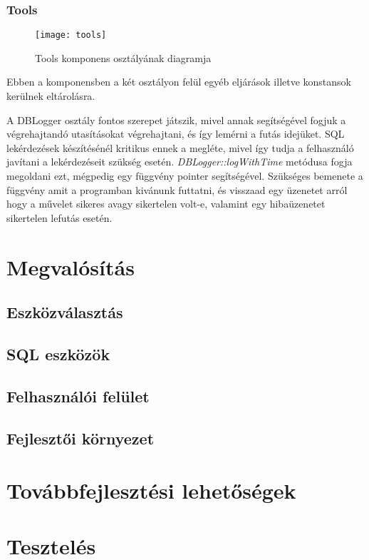 \subsubsection{Tools}

\begin{figure}[ht]
  \begin{center}
  \texttt{[image: tools]}
  \end{center}
 \caption{Tools komponens osztályának diagramja}
\end{figure}

Ebben a komponensben a két osztályon felül egyéb eljárások illetve konstansok kerülnek eltárolásra.

A DBLogger osztály fontos szerepet játszik, mivel annak segítségével fogjuk a végrehajtandó utasításokat végrehajtani, és így lemérni a futás
idejüket. SQL lekérdezések készítésénél kritikus ennek a megléte, mivel így tudja a felhasználó javítani a lekérdezéseit szükség esetén.
\textit{DBLogger::logWithTime} metódusa fogja megoldani ezt, mégpedig egy függvény pointer segítségével. Szükséges bemenete a függvény amit
a programban kivánunk futtatni, és visszaad egy üzenetet arról hogy a művelet sikeres avagy sikertelen volt-e, valamint egy hibaüzenetet
sikertelen lefutás esetén.

\section{Megvalósítás}
\subsection{Eszközválasztás}
\subsection{SQL eszközök}
\subsection{Felhasználói felület}
\subsection{Fejlesztői környezet}

\section{Továbbfejlesztési lehetőségek}

\section{Tesztelés}